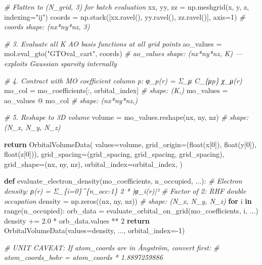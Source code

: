 \documentclass[
  11pt,
]{report}
\newenvironment{Shaded}{}{}
\newcommand{\BuiltInTok}[1]{\textcolor[rgb]{0.00,0.50,0.00}{#1}}
\newcommand{\CommentTok}[1]{\textcolor[rgb]{0.38,0.63,0.69}{\textit{#1}}}
\newcommand{\ControlFlowTok}[1]{\textcolor[rgb]{0.00,0.44,0.13}{\textbf{#1}}}
\newcommand{\DecValTok}[1]{\textcolor[rgb]{0.25,0.63,0.44}{#1}}
\newcommand{\FloatTok}[1]{\textcolor[rgb]{0.25,0.63,0.44}{#1}}
\newcommand{\KeywordTok}[1]{\textcolor[rgb]{0.00,0.44,0.13}{\textbf{#1}}}
\newcommand{\NormalTok}[1]{#1}
\newcommand{\OperatorTok}[1]{\textcolor[rgb]{0.40,0.40,0.40}{#1}}
\newcommand{\StringTok}[1]{\textcolor[rgb]{0.25,0.44,0.63}{#1}}
\begin{document}
\begin{Shaded}
\begin{Highlighting}[]
    \CommentTok{\# Flatten to (N\_grid, 3) for batch evaluation}
\NormalTok{    xx, yy, zz }\OperatorTok{=}\NormalTok{ np.meshgrid(x, y, z, indexing}\OperatorTok{=}\StringTok{"ij"}\NormalTok{)}
\NormalTok{    coords }\OperatorTok{=}\NormalTok{ np.stack([xx.ravel(), yy.ravel(), zz.ravel()], axis}\OperatorTok{=}\DecValTok{1}\NormalTok{)}
    \CommentTok{\# coords shape: (nx*ny*nz, 3)}

    \CommentTok{\# 3. Evaluate all K AO basis functions at all grid points}
\NormalTok{    ao\_values }\OperatorTok{=}\NormalTok{ mol.eval\_gto(}\StringTok{"GTOval\_cart"}\NormalTok{, coords)}
    \CommentTok{\# ao\_values shape: (nx*ny*nz, K) — exploits Gaussian sparsity internally}

    \CommentTok{\# 4. Contract with MO coefficient column p: φ\_p(r) = Σ\_μ C\_\{μp\} χ\_μ(r)}
\NormalTok{    mo\_col }\OperatorTok{=}\NormalTok{ mo\_coefficients[:, orbital\_index]   }\CommentTok{\# shape: (K,)}
\NormalTok{    mo\_values }\OperatorTok{=}\NormalTok{ ao\_values }\OperatorTok{@}\NormalTok{ mo\_col               }\CommentTok{\# shape: (nx*ny*nz,)}

    \CommentTok{\# 5. Reshape to 3D volume}
\NormalTok{    volume }\OperatorTok{=}\NormalTok{ mo\_values.reshape(nx, ny, nz)       }\CommentTok{\# shape: (N\_x, N\_y, N\_z)}

    \ControlFlowTok{return}\NormalTok{ OrbitalVolumeData(}
\NormalTok{        values}\OperatorTok{=}\NormalTok{volume,}
\NormalTok{        grid\_origin}\OperatorTok{=}\NormalTok{(}\BuiltInTok{float}\NormalTok{(x[}\DecValTok{0}\NormalTok{]), }\BuiltInTok{float}\NormalTok{(y[}\DecValTok{0}\NormalTok{]), }\BuiltInTok{float}\NormalTok{(z[}\DecValTok{0}\NormalTok{])),}
\NormalTok{        grid\_spacing}\OperatorTok{=}\NormalTok{(grid\_spacing, grid\_spacing, grid\_spacing),}
\NormalTok{        grid\_shape}\OperatorTok{=}\NormalTok{(nx, ny, nz),}
\NormalTok{        orbital\_index}\OperatorTok{=}\NormalTok{orbital\_index,}
\NormalTok{    )}


\KeywordTok{def}\NormalTok{ evaluate\_electron\_density(mo\_coefficients, n\_occupied, ...):}
    \CommentTok{\# Electron density: ρ(r) = Σ\_\{i=0\}\^{}\{n\_occ{-}1\} 2 * |φ\_i(r)|²}
    \CommentTok{\# Factor of 2: RHF double occupation}
\NormalTok{    density }\OperatorTok{=}\NormalTok{ np.zeros((nx, ny, nz))             }\CommentTok{\# shape: (N\_x, N\_y, N\_z)}
    \ControlFlowTok{for}\NormalTok{ i }\KeywordTok{in} \BuiltInTok{range}\NormalTok{(n\_occupied):}
\NormalTok{        orb\_data }\OperatorTok{=}\NormalTok{ evaluate\_orbital\_on\_grid(mo\_coefficients, i, ...)}
\NormalTok{        density }\OperatorTok{+=} \FloatTok{2.0} \OperatorTok{*}\NormalTok{ orb\_data.values }\OperatorTok{**} \DecValTok{2}
    \ControlFlowTok{return}\NormalTok{ OrbitalVolumeData(values}\OperatorTok{=}\NormalTok{density, ..., orbital\_index}\OperatorTok{={-}}\DecValTok{1}\NormalTok{)}

    \CommentTok{\# UNIT CAVEAT: If atom\_coords are in Ångström, convert first:}
    \CommentTok{\# atom\_coords\_bohr = atom\_coords * 1.8897259886}
\end{Highlighting}
\end{Shaded}
\end{document}
